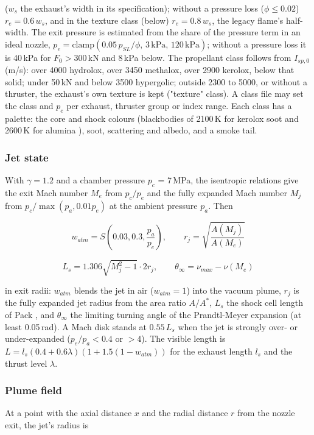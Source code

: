 \documentclass[Orbiter Technical Reference.tex]{subfiles}
\begin{document}
\begin{sloppypar}
\noindent
($w_{s}$ the exhaust's width in its specification); without a pressure loss ($\phi \le 0.02$) $r_{e} = 0.6\,w_{s}$, and in the texture class (below) $r_{e} = 0.8\,w_{s}$, the legacy flame's half-width. The exit pressure is estimated from the share of the pressure term in an ideal nozzle, $p_{e} = \mathrm{clamp}(0.05\,p_{SL}/\phi,\, 3\,\mathrm{kPa},\, 120\,\mathrm{kPa})$; without a pressure loss it is 40\,kPa for $F_{0} > 300$\,kN and 8\,kPa below. The propellant class follows from $I_{sp,0}$ (m/s): over 4000 hydrolox, over 3450 methalox, over 2900 kerolox, below that solid; under 50\,kN and below 3500 hypergolic; outside 2300 to 5000, or without a thruster, the exhaust's own texture is kept ("texture" class). A class file may set the class and $p_{e}$ per exhaust, thruster group or index range. Each class has a palette: the core and shock colours (blackbodies of 2100\,K for kerolox soot and 2600\,K for alumina \cite{wyman2013}), soot, scattering and albedo, and a smoke tail.

\subsubsection{Jet state}
With $\gamma = 1.2$ and a chamber pressure $p_{c}$ = 7\,MPa, the isentropic relations \cite{anderson2003} give the exit Mach number $M_{e}$ from $p_{c}/p_{e}$ and the fully expanded Mach number $M_{j}$ from $p_{c}/\max(p_{a}, 0.01p_{e})$ at the ambient pressure $p_{a}$. Then

\[ w_{atm} = S\left(0.03, 0.3, \frac{p_{a}}{p_{e}}\right), \qquad r_{j} = \sqrt{\frac{A(M_{j})}{A(M_{e})}} \]

\[ L_{s} = 1.306\sqrt{M_{j}^{2} - 1}\cdot 2r_{j}, \qquad \theta_{\infty} = \nu_{max} - \nu(M_{e}) \]

\noindent
in exit radii: $w_{atm}$ blends the jet in air ($w_{atm} = 1$) into the vacuum plume, $r_{j}$ is the fully expanded jet radius from the area ratio $A/A^{*}$, $L_{s}$ the shock cell length of Pack \cite{pack1950}, and $\theta_{\infty}$ the limiting turning angle of the Prandtl-Meyer expansion (at least 0.05\,rad). A Mach disk stands at $0.55\,L_{s}$ when the jet is strongly over- or under-expanded ($p_{e}/p_{a} < 0.4$ or $> 4$). The visible length is $L = l_{s}(0.4 + 0.6\lambda)(1 + 1.5(1 - w_{atm}))$ for the exhaust length $l_{s}$ and the thrust level $\lambda$.

\subsubsection{Plume field}
At a point with the axial distance $x$ and the radial distance $r$ from the nozzle exit, the jet's radius is


\end{sloppypar}
\end{document}
